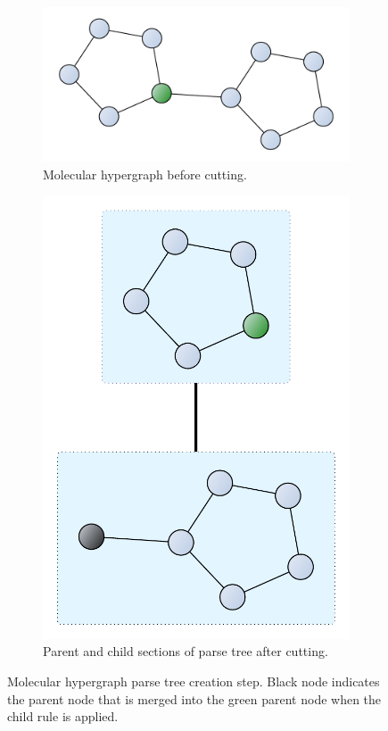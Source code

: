 \documentclass{article}
\begin{document}
\begin{figure}
    \centering
    \begin{subfigure}[b]{0.48\textwidth}
        \centering
        \includegraphics[scale=0.2]{images/mols_rule_before_cut.pdf}
        \caption{Molecular hypergraph before cutting.}
    \end{subfigure}
    \hfill
    \begin{subfigure}[b]{0.48\textwidth}
        \centering
        \includegraphics[scale=0.2]{images/mols_rule_after_cut.pdf}
        \caption{Parent and child sections of parse tree after cutting.}
    \end{subfigure}
    \caption{Molecular hypergraph parse tree creation step. Black node indicates the parent node that is merged into the green parent node when the child rule is applied.}
    \label{fig:parsestep}
\end{figure}
\end{document}
